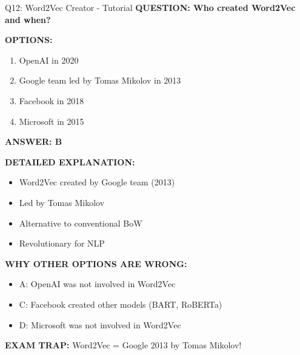 \documentclass[8pt]{beamer}
\begin{document}
	\begin{frame}{Q12: Word2Vec Creator - Tutorial}
		\fontsize{6.5}{7.5}\selectfont
		\textbf{QUESTION: Who created Word2Vec and when?}
		
		\vspace{0.1cm}
		\textbf{OPTIONS:}
		\begin{enumerate}
			\item OpenAI in 2020
			\item Google team led by Tomas Mikolov in 2013
			\item Facebook in 2018
			\item Microsoft in 2015
		\end{enumerate}
		
		\vspace{0.1cm}
		\textcolor{myblue}{\textbf{ANSWER: B}}
		
		\vspace{0.1cm}
		\textbf{DETAILED EXPLANATION:}
		\begin{itemize}
			\item Word2Vec created by Google team (2013)
			\item Led by Tomas Mikolov
			\item Alternative to conventional BoW
			\item Revolutionary for NLP
		\end{itemize}
		
		\vspace{0.1cm}
		\textcolor{myred}{\textbf{WHY OTHER OPTIONS ARE WRONG:}}
		\begin{itemize}
			\item \textcolor{myred}{A:} OpenAI was not involved in Word2Vec
			\item \textcolor{myred}{C:} Facebook created other models (BART, RoBERTa)
			\item \textcolor{myred}{D:} Microsoft was not involved in Word2Vec
		\end{itemize}
		
		\textcolor{myred}{\textbf{EXAM TRAP:}} Word2Vec = \textcolor{myblue}{Google 2013} by Tomas Mikolov!
	\end{frame}
	
\end{document}
